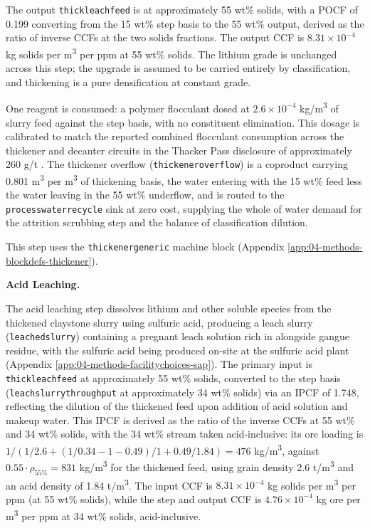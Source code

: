 \documentclass{article}
\renewcommand\_{\textunderscore\allowbreak}
\begin{document}
The output \texttt{thick\_leach\_feed} is at approximately 55 wt\% solids, with a POCF of 0.199 converting from the 15 wt\% step basis to the 55 wt\% output, derived as the ratio of inverse CCFs at the two solids fractions. The output CCF is $8.31 \times 10^{-4}$ kg solids per \si{m^3} per ppm at 55 wt\% solids. The lithium grade is unchanged across this step; the upgrade is assumed to be carried entirely by classification, and thickening is a pure densification at constant grade.

One reagent is consumed: a polymer flocculant dosed at $2.6 \times 10^{-4}$ \si{kg/m^3} of slurry feed against the step basis, with no constituent elimination. This dosage is calibrated to match the reported combined flocculant consumption across the thickener and decanter circuits in the Thacker Pass disclosure of approximately 260 g/t \cite{sgscanadaincSK1300Technical2024}. The thickener overflow (\texttt{thickener\_overflow}) is a coproduct carrying 0.801 \si{m^3} per \si{m^3} of thickening basis, the water entering with the 15 wt\% feed less the water leaving in the 55 wt\% underflow, and is routed to the \texttt{process\_water\_recycle} sink at zero cost, supplying the whole of water demand for the attrition scrubbing step and the balance of classification dilution.

This step uses the \texttt{thickener\_generic} machine block (Appendix \ref{app:04-methods-blockdefs-thickener}).

\medskip
\noindent\textbf{Acid Leaching.}\quad

The acid leaching step dissolves lithium and other soluble species from the thickened claystone slurry using sulfuric acid, producing a leach slurry (\texttt{leached\_slurry}) containing a pregnant leach solution rich in  alongside gangue residue, with the sulfuric acid being produced on-site at the sulfuric acid plant (Appendix \ref{app:04-methods-facilitychoices-sap}). The primary input is \texttt{thick\_leach\_feed} at approximately 55 wt\% solids, converted to the step basis (\texttt{leach\_slurry\_throughput} at approximately 34 wt\% solids) via an IPCF of 1.748, reflecting the dilution of the thickened feed upon addition of acid solution and makeup water. This IPCF is derived as the ratio of the inverse CCFs at 55 wt\% and 34 wt\% solids, with the 34 wt\% stream taken acid-inclusive: its ore loading is $1/(1/2.6 + (1/0.34 - 1 - 0.49)/1 + 0.49/1.84) = 476$ \si{kg/m^3}, against $0.55 \cdot \rho_{\text{55\%}} = 831$ \si{kg/m^3} for the thickened feed, using grain density 2.6 \si{t/m^3} and an acid density of 1.84 \si{t/m^3}. The input CCF is $8.31 \times 10^{-4}$ kg solids per \si{m^3} per ppm (at 55 wt\% solids), while the step and output CCF is $4.76 \times 10^{-4}$ kg ore per \si{m^3} per ppm at 34 wt\% solids, acid-inclusive. 
\end{document}
